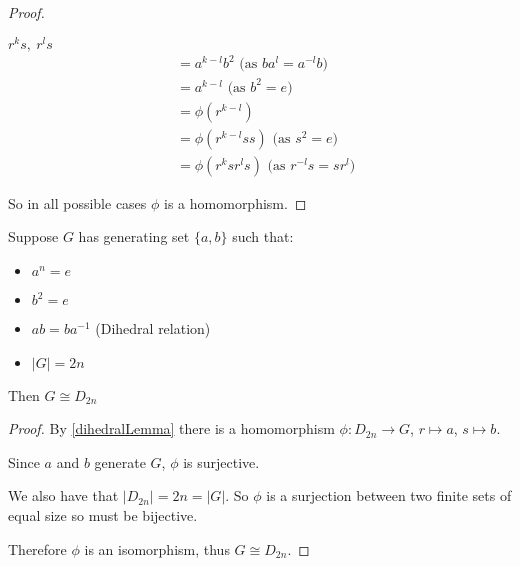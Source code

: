 \documentclass[../main.tex]{subfiles}
\begin{document}
\begin{proof}
\begin{proofcases}
\begin{case}{$r^{k}s,\ r^{l}s$}
\begin{align*}
                                 &= a^{k - l} b^2 \text{ (as $ba^{l} = a^{-l}b$)}\\
                                 &= a^{k - l} \text{ (as $b^2 = e$)}\\
                                 &= \phi(r^{k - l}) \\
                                 &= \phi(r^{k - l} s s) \text{ (as $s^2 = e$)}\\
                                 &= \phi(r^{k} s r^{l} s) \text{ (as $r^{-l}s = sr^{l}$)}
      \end{align*}
    \end{case}
  \end{proofcases}
  So in all possible cases $\phi$ is a homomorphism.
\end{proof}
\begin{proposition}
  Suppose $G$ has generating set $\{a, b\}$ such that:
  \begin{itemize}
    \item $a^{n} = e$
    \item $b^{2} = e$
    \item $ab = ba^{-1}$ (Dihedral relation)
    \item $|G| = 2n$
  \end{itemize}
  Then $G \cong D_{2n}$
\end{proposition}
\begin{proof}
  By \cref{dihedralLemma} there is a homomorphism $\phi: D_{2n} \to G$, $r \mapsto a$, $s \mapsto b$.

  Since $a$ and $b$ generate $G$, $\phi$ is surjective.

  We also have that $|D_{2n}| = 2n = |G|$.
  So $\phi$ is a surjection between two finite sets of equal size so must be bijective.

  Therefore $\phi$ is an isomorphism, thus $G \cong D_{2n}$.
\end{proof}
\end{document}

